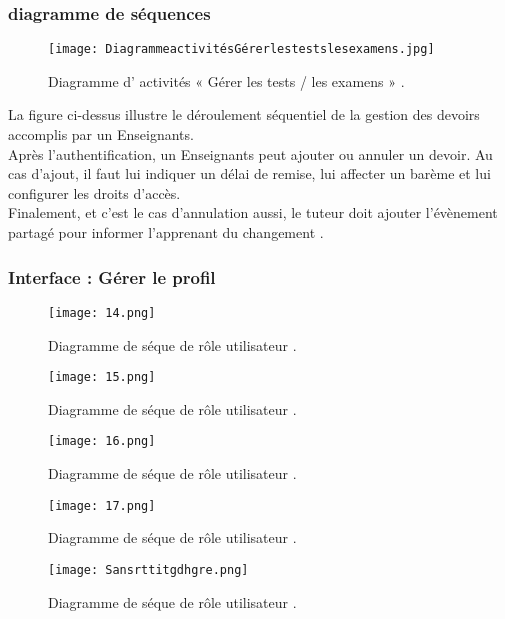 \subsubsection{diagramme de séquences }
\begin{figure}[ht]
	\centering
	\texttt{[image: DiagrammeactivitésGérerlestestslesexamens.jpg]}
	\caption{Diagramme d' activités « Gérer les tests / les examens » .}
	\label{fig:Diagramme d' activités  Gérer les tests / les examens }
\end{figure}
\FloatBarrier
{}

La figure ci-dessus illustre le déroulement séquentiel de la gestion des devoirs accomplis par un
Enseignants.\\
Après l’authentification, un Enseignants peut ajouter ou annuler un devoir. Au cas d’ajout, il faut lui
indiquer un délai de remise, lui affecter un barème et lui configurer les droits d’accès.\\
Finalement, et c’est le cas d’annulation aussi, le tuteur doit ajouter l’évènement partagé pour informer l’apprenant du changement .
\clearpage
\subsubsection{ Interface : Gérer le profil  }
\begin{figure}[ht]
	\centering
	\texttt{[image: 14.png]}
	\caption{Diagramme de séque de rôle utilisateur .}
	\label{fig:Diagramme de séon de rôle utilisateur }
\end{figure}
\FloatBarrier
\begin{figure}[ht]
	\centering
	\texttt{[image: 15.png]}
	\caption{Diagramme de séque de rôle utilisateur .}
	\label{fig:Diagramme de séon de rôle utilisateur }
\end{figure}
\FloatBarrier
\begin{figure}[ht]
	\centering
	\texttt{[image: 16.png]}
	\caption{Diagramme de séque de rôle utilisateur .}
	\label{fig:Diagramme de séon de rôle utilisateur }
\end{figure}
\FloatBarrier
\begin{figure}[ht]
	\centering
	\texttt{[image: 17.png]}
	\caption{Diagramme de séque de rôle utilisateur .}
	\label{fig:Diagramme de séon de rôle utilisateur }
\end{figure}
\FloatBarrier
\begin{figure}[ht]
	\centering
	\texttt{[image: Sansrttitgdhgre.png]}
	\caption{Diagramme de séque de rôle utilisateur .}
	\label{fig:Diagramme de séon de rôle utilisateur }
\end{figure}
\FloatBarrier
\clearpage
